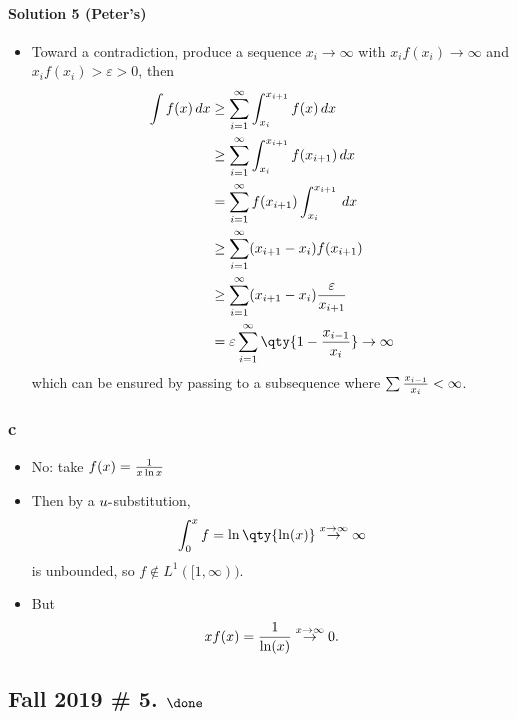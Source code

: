 \begin{solution}
\hypertarget{solution-5-peters}{%
\paragraph{Solution 5 (Peter's)}\label{solution-5-peters}}

\begin{itemize}
\tightlist
\item
  Toward a contradiction, produce a sequence \(x_i\to\infty\) with
  \(x_i f(x_i) \to \infty\) and \(x_if(x_i) > \varepsilon> 0\), then
  \begin{align*}
  \int f(x) \, dx 
  &\geq \sum_{i=1}^\infty \int_{x_i}^{x_{i+1}} f(x) \, dx \\
  &\geq \sum_{i=1}^\infty \int_{x_i}^{x_{i+1}} f(x_{i+1}) \, dx \\
  &=    \sum_{i=1}^\infty f(x_{i+1}) \int_{x_i}^{x_{i+1}} \, dx \\
  &\geq \sum_{i=1}^\infty (x_{i+1} - x_i) f(x_{i+1}) \\
  &\geq \sum_{i=1}^\infty (x_{i+1} - x_i) {\varepsilon\over x_{i+1}} \\
  &= \varepsilon\sum_{i=1}^\infty \qty{ 1 - {x_{i-1} \over x_i}} \to \infty
  \end{align*}
  which can be ensured by passing to a subsequence where
  \(\sum {x_{i-1} \over x_i} < \infty\).
\end{itemize}

\hypertarget{c-1}{%
\subsubsection{c}\label{c-1}}

\begin{itemize}
\tightlist
\item
  No: take \(f(x) = {1\over x\ln x}\)
\item
  Then by a \(u{\hbox{-}}\)substitution,
  \begin{align*}
  \int_0^x f = \ln\qty{\ln (x)} \overset{x\to\infty}\to \infty
  \end{align*}
  is unbounded, so \(f\not\in L^1([1, \infty))\).
\item
  But
  \begin{align*}
  xf(x) = { 1 \over \ln(x)} \overset{x\to\infty} \to 0
  .\end{align*}
\end{itemize}

\end{solution}

\hypertarget{fall-2019-5.-done}{%
\subsection{\texorpdfstring{Fall 2019 \# 5.
\(\done\)}{Fall 2019 \# 5. \textbackslash done}}\label{fall-2019-5.-done}}

